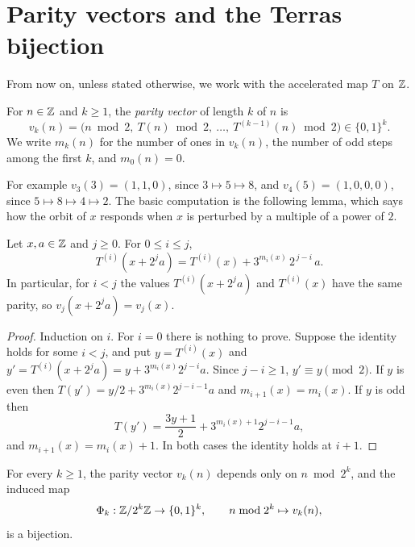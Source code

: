\section{Parity vectors and the Terras bijection}\label{sec:ch2:terras}

From now on, unless stated otherwise, we work with the accelerated map $T$ on
$\mathbb{Z}$.

\begin{definition}\label{def:ch2:parity}
For $n\in\mathbb{Z}$ and $k\geq1$, the \emph{parity vector} of length $k$ of $n$ is
\[
  v_k(n)=\bigl(n\bmod2,\ T(n)\bmod2,\ \ldots,\ T^{(k-1)}(n)\bmod2\bigr)\in\{0,1\}^k .
\]
We write $m_k(n)$ for the number of ones in $v_k(n)$, the number of odd steps
among the first $k$, and $m_0(n)=0$.
\end{definition}

For example $v_3(3)=(1,1,0)$, since $3\mapsto5\mapsto8$, and $v_4(5)=(1,0,0,0)$,
since $5\mapsto8\mapsto4\mapsto2$. The basic computation is the following
lemma, which says how the orbit of $x$ responds when $x$ is perturbed by a
multiple of a power of $2$.

\begin{lemma}\label{lem:ch2:perturb}
Let $x,a\in\mathbb{Z}$ and $j\geq0$. For $0\leq i\leq j$,
\[
  T^{(i)}(x+2^ja)=T^{(i)}(x)+3^{m_i(x)}\,2^{\,j-i}\,a .
\]
In particular, for $i<j$ the values $T^{(i)}(x+2^ja)$ and $T^{(i)}(x)$ have the
same parity, so $v_j(x+2^ja)=v_j(x)$.
\end{lemma}

\begin{proof}
Induction on $i$. For $i=0$ there is nothing to prove. Suppose the identity
holds for some $i<j$, and put $y=T^{(i)}(x)$ and $y'=T^{(i)}(x+2^ja)=
y+3^{m_i(x)}2^{j-i}a$. Since $j-i\geq1$, $y'\equiv y\pmod2$. If $y$ is even
then $T(y')=y/2+3^{m_i(x)}2^{j-i-1}a$ and $m_{i+1}(x)=m_i(x)$. If $y$ is odd
then
\[
  T(y')=\frac{3y+1}{2}+3^{m_i(x)+1}2^{j-i-1}a ,
\]
and $m_{i+1}(x)=m_i(x)+1$. In both cases the identity holds at $i+1$.
\end{proof}

\begin{theorem}\label{thm:terras}
For every $k\geq1$, the parity vector $v_k(n)$ depends only on $n\bmod2^k$,
and the induced map
\[
  \Phi_k:\mathbb{Z}/2^k\mathbb{Z}\to\{0,1\}^k,\qquad n\bmod2^k\mapsto v_k(n),
\]
is a bijection.
\end{theorem}

